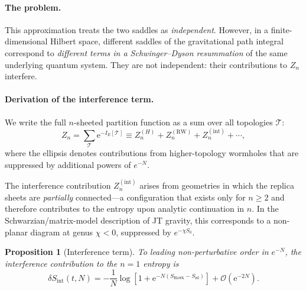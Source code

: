 \documentclass[12pt,a4paper]{article}
\newtheorem{proposition}[theorem]{Proposition}
\newcommand{\SHawk}{S_{\mathrm{Hawk}}}
\newcommand{\Sisl}{S_{\mathrm{isl}}}
\newcommand{\dS}{\delta S}
\newcommand{\OO}{\mathcal{O}}
\newcommand{\e}{\mathrm{e}}
\begin{document}
\paragraph{The problem.}
This approximation treats the two saddles as \emph{independent}.  However,
in a finite-dimensional Hilbert space, different saddles of the gravitational
path integral correspond to \emph{different terms in a Schwinger--Dyson
resummation} of the same underlying quantum system.  They are not independent:
their contributions to $Z_n$ interfere.

\paragraph{Derivation of the interference term.}
We write the full $n$-sheeted partition function as a sum over all topologies
$\mathcal{T}$:
\begin{equation}
  Z_n = \sum_{\mathcal{T}} \e^{-I_E[\mathcal{T}]} \equiv Z_n^{(H)}
    + Z_n^{(\mathrm{RW})} + Z_n^{(\mathrm{int})} + \cdots,
\label{eq:Z_full}
\end{equation}
where the ellipsis denotes contributions from higher-topology wormholes that
are suppressed by additional powers of $e^{-N}$.

The interference contribution $Z_n^{(\mathrm{int})}$ arises from
geometries in which the replica sheets are \emph{partially} connected—a
configuration that exists only for $n \ge 2$ and therefore contributes to
the entropy upon analytic continuation in $n$.  In the
Schwarzian/matrix-model description of JT gravity, this corresponds to a
non-planar diagram at genus $\chi < 0$, suppressed by $e^{-\chi S_0}$.

\begin{proposition}[Interference term]
\label{prop:interference}
To leading non-perturbative order in $e^{-N}$, the interference contribution
to the $n=1$ entropy is
\begin{equation}
  \dS_{\mathrm{int}}(t,N) = -\frac{1}{N}\log\!\left[1
    + \e^{-N(\SHawk - \Sisl)}\right]
    + \OO\!\left(\e^{-2N}\right).
\label{eq:interference_term}
\end{equation}
\end{proposition}
\end{document}
